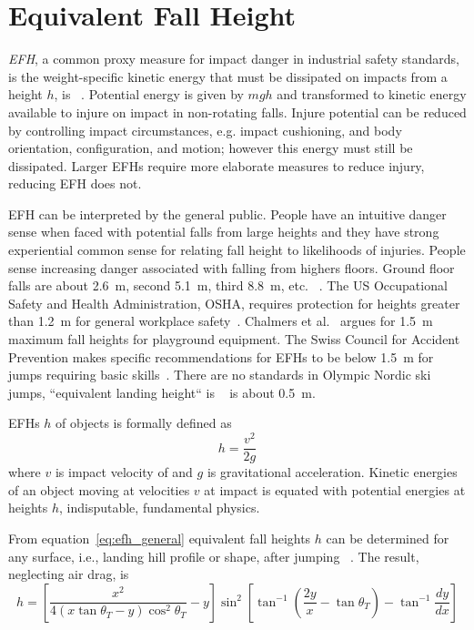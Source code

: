 \documentclass[smallextended]{svjour3}       %
\begin{document}
\section{Equivalent Fall Height}
\label{sec:efh}
%
\emph{EFH}, a common proxy measure for impact danger in
industrial safety standards, is the weight-specific kinetic energy that must be dissipated on impacts from a height $h$, is ~\cite{Hubbard2012}.  Potential
energy is given by  $mgh$ and transformed to kinetic
energy available to injure on impact in non-rotating falls. Injure potential can be reduced by controlling impact circumstances, e.g.
impact cushioning, and body orientation, configuration, and motion;
however this energy must still be dissipated. Larger EFHs
require more elaborate measures to reduce injury, reducing EFH does not.

EFH can be interpreted by the general public. People have an intuitive danger sense when
faced with potential falls from large heights and they have strong experiential common sense
for relating fall height to likelihoods of injuries. People sense increasing danger associated with falling from highers floors. Ground floor falls
are about 2.6~\si{\meter}, second 5.1~\si{\meter}, third
8.8~\si{\meter}, etc. ~\cite{Vish2005}. The US Occupational Safety
and Health Administration, OSHA, requires protection for heights
greater than 1.2~\si{\meter} for general workplace safety~\cite{OSHA2021}.
Chalmers et al.~\cite{Chalmers1996} argues for 1.5~\si{\meter} maximum fall
heights for playground equipment. The Swiss Council for Accident Prevention
makes specific recommendations for EFHs to be below
1.5~\si{\meter} for jumps requiring basic skills~\cite{Heer2019}. There are no standards in Olympic Nordic ski jumps, ``equivalent landing
height`` is ~\cite{Gasser2018} is about 0.5~\si{\meter}.

EFHs $h$ of objects is formally defined as
%
\begin{equation} h = \frac{v^2}{2g} \label{eq:efh_general} \end{equation}
%
where $v$ is impact velocity of  and $g$ is gravitational acceleration.  Kinetic energies of an
object moving at velocities $v$ at impact is equated with potential energies at heights $h$, indisputable, fundamental physics.

From equation~\ref{eq:efh_general} equivalent fall
heights $h$ can be determined for any surface, i.e., landing hill profile or shape, after jumping ~\cite{Petrone2017}. The result, neglecting air
drag, is
%
\begin{equation}
  h = \left[\frac{x^2}{4(x\tan\theta_T - y)\cos^{2}\theta_T} -
    y\right]\sin^{2}\left[\tan^{-1}\left(\frac{2y}{x}- \tan\theta_T\right) -
    \tan^{-1}\frac{dy}{dx}\right]
  \label{eq:efh}
\end{equation}
\end{document}
